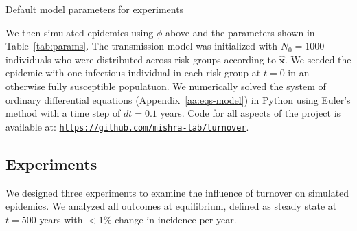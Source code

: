 \begin{table}
  \centering
  \caption{Default model parameters for experiments}
  \label{tab:params}
  
\end{table}
We then simulated epidemics using $\phi$ above
and the parameters shown in Table~\ref{tab:params}.
The transmission model was initialized with $N_0 = 1000$ individuals
who were distributed across risk groups according to $\bm{\hat{x}}$.
We seeded the epidemic with
one infectious individual in each risk group at $t = 0$ in an otherwise 
fully susceptible populatuon.
We numerically solved the system of ordinary differential equations
(Appendix~\ref{aa:eqs-model}) in Python
using Euler's method with a time step of $dt = 0.1$ years.
Code for all aspects of the project is available at:
\href{https://github.com/mishra-lab/turnover}{\small\texttt{https://github.com/mishra-lab/turnover}}.
\subsection{Experiments}
\label{ss:exp}
We designed three experiments to examine the influence of turnover on simulated epidemics.
We analyzed all outcomes at equilibrium,
defined as steady state at $t = 500$ years
with $<1\%$ change in incidence per year.
